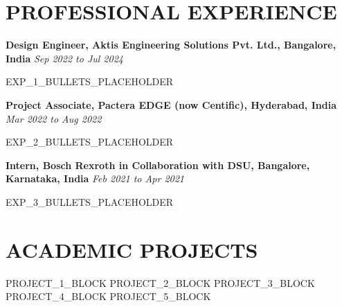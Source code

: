 \documentclass[a4paper,10pt]{extarticle}
\begin{document}
\section{PROFESSIONAL EXPERIENCE}

\noindent \textbf{Design Engineer, Aktis Engineering Solutions Pvt. Ltd., Bangalore, India} \hfill \textit{Sep 2022 to Jul 2024}
\begin{itemize}
  EXP\_1\_BULLETS\_PLACEHOLDER
\end{itemize}

\vspace{2pt}
\noindent \textbf{Project Associate, Pactera EDGE (now Centific), Hyderabad, India} \hfill \textit{Mar 2022 to Aug 2022}
\begin{itemize}
  EXP\_2\_BULLETS\_PLACEHOLDER
\end{itemize}

\vspace{2pt}
\noindent \textbf{Intern, Bosch Rexroth in Collaboration with DSU, Bangalore, Karnataka, India } \hfill \textit{Feb 2021 to Apr 2021}
\begin{itemize}
  EXP\_3\_BULLETS\_PLACEHOLDER
\end{itemize}

\section{ACADEMIC PROJECTS}

PROJECT\_1\_BLOCK
\vspace{XPROJSEPX plus 4pt}
PROJECT\_2\_BLOCK
\vspace{XPROJSEPX plus 4pt}
PROJECT\_3\_BLOCK
\vspace{XPROJSEPX plus 4pt}
PROJECT\_4\_BLOCK
\vspace{XPROJSEPX plus 4pt}
PROJECT\_5\_BLOCK
\end{document}

